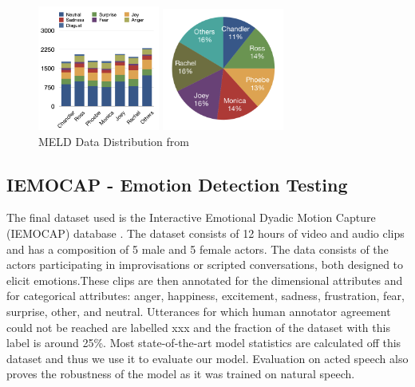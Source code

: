 \documentclass{article}
\begin{document}
\begin{figure}[htb]

\begin{minipage}[b]{.48\linewidth}
  \centering
  \centerline{\includegraphics[width=4cm]{meld_1}}
\end{minipage}
\hfill
\begin{minipage}[b]{0.48\linewidth}
  \centering
  \centerline{\includegraphics[width=4cm]{meld_2}}
\end{minipage}
  \caption{MELD Data Distribution from \cite{meld}}
\end{figure}

\subsection{IEMOCAP - Emotion Detection Testing}

The final dataset used is the Interactive Emotional Dyadic Motion Capture (IEMOCAP) database \cite{iemocap}. The dataset consists of 12 hours of video and audio clips and has a composition of 5 male and 5 female actors. The data consists of the actors participating in improvisations or scripted conversations, both designed to elicit emotions.These clips are then annotated for the dimensional attributes and for categorical attributes: anger, happiness, excitement, sadness, frustration, fear, surprise, other, and neutral. Utterances for which human annotator agreement could not be reached are labelled xxx and the fraction of the dataset with this label is around 25\%. Most state-of-the-art model statistics are calculated off this dataset and thus we use it to evaluate our model. Evaluation on acted speech also proves the robustness of the model as it was trained on natural speech.
\end{document}
